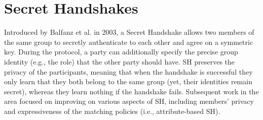 \section{Secret Handshakes}\label{sec:sh}

Introduced by Balfanz et al. \cite{Balfanz} in 2003, a Secret Handshake allows two members of the same group to secretly authenticate to each other and agree on a symmetric key.
During the protocol, a party can additionally specify the precise group identity (e.g., the role) that the other party should have.
\newline\newline
SH preserves the privacy of the participants, meaning that when the handshake is successful they only learn that they both belong to the same group (yet, their identities remain secret), whereas they learn nothing if the handshake fails. Subsequent work in the area focused on improving on various aspects of SH, including members' privacy and expressiveness of the matching policies (i.e., attribute-based SH).